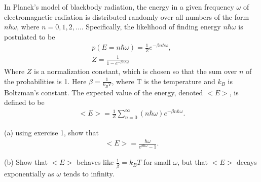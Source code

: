 \documentclass[10pt]{article}
\newenvironment{problem}[2][Problem]{\begin{trivlist}
		\item[\hskip \labelsep {\bfseries #1}\hskip \labelsep {\bfseries #2.}]}{\end{trivlist}}
\begin{document}
	\begin{problem}{1.2}
		In Planck’s model of blackbody radiation, the energy in a given frequency $\omega$ of electromagnetic radiation is distributed randomly over all numbers of the form $n \hbar \omega$, where $n = 0, 1, 2, . . . $. Specifically, the likelihood of finding energy $n \hbar \omega$ is postulated to be\\
		\begin{align*}
			p(E=n \hbar \omega) = \frac{1}{Z}e^{-\beta n \hbar \omega},\\
			Z = \frac{1}{1-e^{-\beta n \hbar \omega}}
		\end{align*}
		Where $Z$ is a normalization constant, which is chosen so that the sum over $n$ of the probabilities is 1. Here $\beta = \frac{1}{k_{B}T}$, where T is the temperature and $k_{B}$ is Boltzman's constant. The expected value of the energy, denoted $<E>$, is defined to be
		\begin{align*}
			<E> = \frac{1}{Z} \sum_{n=0}^{\infty} (n \hbar \omega) e^{-\beta n \hbar \omega}.
		\end{align*}
		
		(a) using exercise 1, show that
		\begin{align*}
			<E> = \frac{\hbar \omega}{e^{\beta \hbar \omega} - 1}.
		\end{align*}
		
		(b) Show that $<E>$ behaves like $\frac{1}{\beta} = k_B T$ for small $\omega$, but that
		$<E>$ decays exponentially as $\omega$ tends to infinity.
	\end{problem}
	
\end{document}
